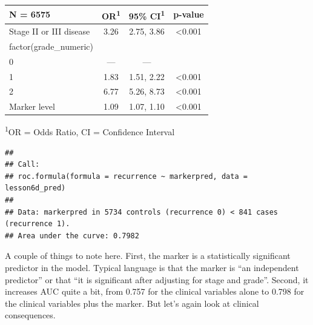 \documentclass[]{book}
\newenvironment{Shaded}{\begin{snugshade}}{\end{snugshade}}
\newcommand{\CommentTok}[1]{\textcolor[rgb]{0.56,0.35,0.01}{\textit{#1}}}
\newcommand{\DataTypeTok}[1]{\textcolor[rgb]{0.13,0.29,0.53}{#1}}
\newcommand{\KeywordTok}[1]{\textcolor[rgb]{0.13,0.29,0.53}{\textbf{#1}}}
\newcommand{\NormalTok}[1]{#1}
\newcommand{\OperatorTok}[1]{\textcolor[rgb]{0.81,0.36,0.00}{\textbf{#1}}}
\newcommand{\StringTok}[1]{\textcolor[rgb]{0.31,0.60,0.02}{#1}}
\begin{document}
\captionsetup[table]{labelformat=empty,skip=1pt}
\begin{longtable}{lccc}
\toprule
\textbf{N = 6575} & \textbf{OR}\textsuperscript{1} & \textbf{95\% CI}\textsuperscript{1} & \textbf{p-value} \\ 
\midrule
Stage II or III disease & 3.26 & 2.75, 3.86 & <0.001 \\ 
factor(grade\_numeric) &  &  &  \\ 
0 & --- & --- &  \\ 
1 & 1.83 & 1.51, 2.22 & <0.001 \\ 
2 & 6.77 & 5.26, 8.73 & <0.001 \\ 
Marker level & 1.09 & 1.07, 1.10 & <0.001 \\ 
\bottomrule
\end{longtable}
\vspace{-5mm}
\begin{minipage}{\linewidth}
\textsuperscript{1}OR = Odds Ratio, CI = Confidence Interval \\ 
\end{minipage}

\begin{Shaded}
\end{Shaded}

\begin{verbatim}
## 
## Call:
## roc.formula(formula = recurrence ~ markerpred, data = lesson6d_pred)
## 
## Data: markerpred in 5734 controls (recurrence 0) < 841 cases (recurrence 1).
## Area under the curve: 0.7982
\end{verbatim}

A couple of things to note here. First, the marker is a statistically
significant predictor in the model. Typical language is that the marker
is ``an independent predictor'' or that ``it is significant after
adjusting for stage and grade''. Second, it increases AUC quite a bit,
from 0.757 for the clinical variables alone to 0.798 for the clinical
variables plus the marker. But let's again look at clinical
consequences.
\end{document}
